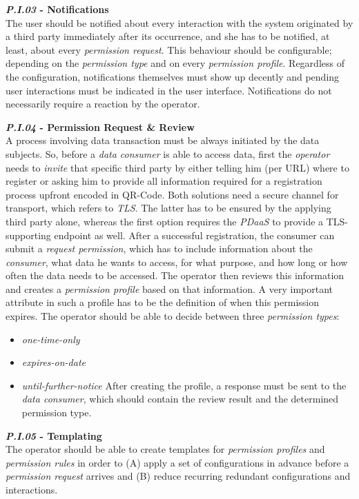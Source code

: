\documentclass[12pt,english,a4paper,titlepage,cleardoublepage=empty,dottedtoc]{report}
\providecommand{\tightlist}{%
  \setlength{\itemsep}{0pt}\setlength{\parskip}{0pt}}
\begin{document}
\textbf{\emph{\protect\hypertarget{pi03}{}{P.I.03}} - Notifications}\\
The user should be notified about every interaction with the system
originated by a third party immediately after its occurrence, and she
has to be notified, at least, about every \emph{permission request}.
This behaviour should be configurable; depending on the \emph{permission
type} and on every \emph{permission profile}. Regardless of the
configuration, notifications themselves must show up decently and
pending user interactions must be indicated in the user interface.
Notifications do not necessarily require a reaction by the operator.

\textbf{\emph{\protect\hypertarget{pi04}{}{P.I.04}} - Permission Request
\& Review}\\
A process involving data transaction must be always initiated by the
data subjects. So, before a \emph{data consumer} is able to access data,
first the \emph{operator} needs to \emph{invite} that specific third
party by either telling him (per URL) where to register or asking him to
provide all information required for a registration process upfront
encoded in QR-Code. Both solutions need a secure channel for transport,
which refers to \emph{TLS}. The latter has to be ensured by the applying
third party alone, whereas the first option requires the \emph{PDaaS} to
provide a TLS-supporting endpoint as well. After a successful
registration, the consumer can submit a \emph{request permission}, which
has to include information about the \emph{consumer}, what data he wants
to access, for what purpose, and how long or how often the data needs to
be accessed. The operator then reviews this information and creates a
\emph{permission profile} based on that information. A very important
attribute in such a profile has to be the definition of when this
permission expires. The operator should be able to decide between three
\emph{permission types}:

\begin{itemize}
\tightlist
\item
  \emph{one-time-only}
\item
  \emph{expires-on-date}
\item
  \emph{until-further-notice} After creating the profile, a response
  must be sent to the \emph{data consumer}, which should contain the
  review result and the determined permission type.
\end{itemize}

\textbf{\emph{\protect\hypertarget{pi05}{}{P.I.05}} - Templating}\\
The operator should be able to create templates for \emph{permission
profiles} and \emph{permission rules} in order to (A) apply a set of
configurations in advance before a \emph{permission request} arrives and
(B) reduce recurring redundant configurations and interactions.
\end{document}
